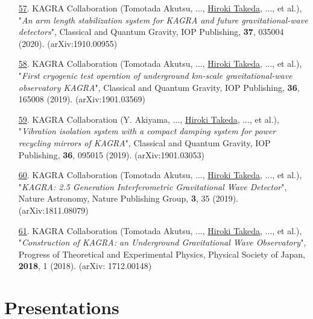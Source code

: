 \documentclass[uplatex, 12pt]{article}
\begin{document}
\begin{enumerate}
\item[\uline{57}.] KAGRA Collaboration (Tomotada Akutsu, ..., \uline{Hiroki Takeda}, ..., et al.), "\emph{An arm length stabilization system for KAGRA and future gravitational-wave detectors}", Classical and Quantum Gravity, IOP Publishing, {\bf 37}, 035004 (2020). (arXiv:1910.00955)\\

\item[\uline{58}.] KAGRA Collaboration (Tomotada Akutsu, ..., \uline{Hiroki Takeda}, ..., et al.), "\emph{First cryogenic test operation of underground km-scale gravitational-wave observatory KAGRA}", Classical and Quantum Gravity, IOP Publishing, {\bf 36}, 165008 (2019). (arXiv:1901.03569)\\

\item[\uline{59}.] KAGRA Collaboration (Y. Akiyama, ..., \uline{Hiroki Takeda}, ..., et al.), "\emph{Vibration isolation system with a compact damping system for power recycling mirrors of KAGRA}", Classical and Quantum Gravity, IOP Publishing, {\bf 36}, 095015 (2019). (arXiv:1901.03053)\\

\item[\uline{60}.] KAGRA Collaboration (Tomotada Akutsu, ..., \uline{Hiroki Takeda}, ..., et al.), "\emph{KAGRA: 2.5 Generation Interferometric Gravitational Wave Detector}", Nature Astronomy, Nature Publishing Group, {\bf 3}, 35 (2019). (arXiv:1811.08079)\\

\item[\uline{61}.] KAGRA Collaboration (Tomotada Akutsu, ..., \uline{Hiroki Takeda}, ..., et al.), "\emph{Construction of KAGRA: an Underground Gravitational Wave Observatory}", Progress of Theoretical and Experimental Physics, Physical Society of Japan, {\bf 2018}, 1 (2018). (arXiv: 1712.00148)

\end{enumerate}


\section*{Presentations}
\end{document}
